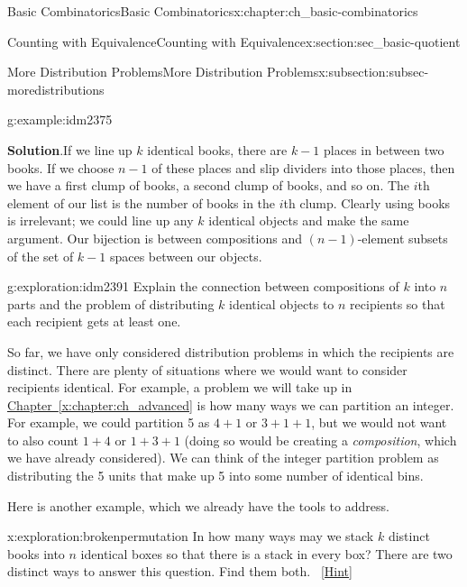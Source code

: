 \documentclass[oneside,10pt,]{book}
\numberwithin{equation}{chapter}
\begin{document}
\begin{chapterptx}{Basic Combinatorics}{}{Basic Combinatorics}{}{}{x:chapter:ch_basic-combinatorics}
\begin{sectionptx}{Counting with Equivalence}{}{Counting with Equivalence}{}{}{x:section:sec_basic-quotient}
\begin{subsectionptx}{More Distribution Problems}{}{More Distribution Problems}{}{}{x:subsection:subsec-moredistributions}
\begin{example}{}{g:example:idm2375}
\par\smallskip%
\noindent\textbf{Solution}.\hypertarget{g:solution:idm2381}{}\quad{}If we line up \(k\) identical books, there are \(k-1\) places in between two books. If we choose \(n-1\) of these places and slip dividers into those places, then we have a first clump of books, a second clump of books, and so on. The \(i\)th element of our list is the number of books in the \(i\)th clump. Clearly using books is irrelevant; we could line up any \(k\) identical objects and make the same argument. Our bijection is between compositions and \((n-1)\)-element subsets of the set of \(k-1\) spaces between our objects.%
\end{example}
\begin{exploration}{}{g:exploration:idm2391}%
Explain the connection between compositions of \(k\) into \(n\) parts and the problem of distributing \(k\) identical objects to \(n\) recipients so that each recipient gets at least one.%
\end{exploration}
So far, we have only considered distribution problems in which the recipients are distinct.  There are plenty of situations where we would want to consider recipients identical.  For example, a problem we will take up in \hyperref[x:chapter:ch_advanced]{Chapter~\ref{x:chapter:ch_advanced}} is how many ways we can partition an integer.  For example, we could partition 5 as \(4+1\) or \(3+1+1\), but we would not want to also count \(1+4\) or \(1+3+1\) (doing so would be creating a \emph{composition}, which we have already considered).  We can think of the integer partition problem as distributing the 5 units that make up 5 into some number of identical bins.%
\par
Here is another example, which we already have the tools to address.%
\begin{exploration}{}{x:exploration:brokenpermutation}%
In how many ways may we stack \(k\) distinct books into \(n\) identical boxes so that there is a stack in every box? There are two distinct ways to answer this question.  Find them both.%
\qquad~\hfill{\tiny\hyperlink{g:hint:idm2417-back}{[Hint]}}\end{exploration}

\end{subsectionptx}
\end{sectionptx}
\end{chapterptx}
\end{document}

